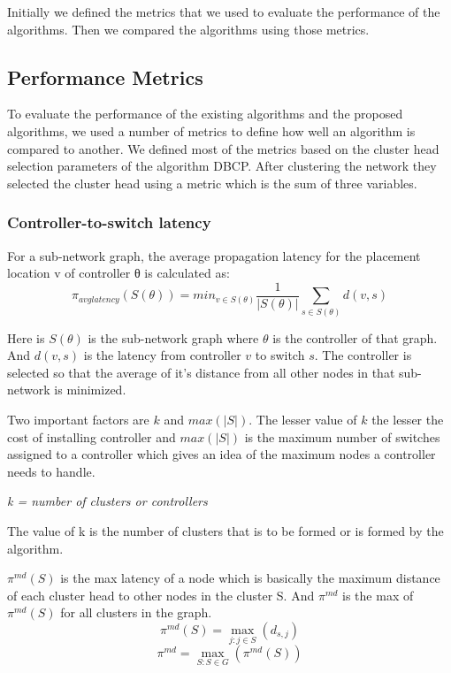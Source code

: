 \documentclass[8pt]{extarticle}
\begin{document}
	Initially we defined the metrics that we used to evaluate the performance of the algorithms. Then we compared the algorithms using those metrics.
	
	\subsection{Performance Metrics} \label{perfm}
	
	To evaluate the performance of the existing algorithms and the proposed algorithms, we used a number of metrics to define how well an algorithm is compared to another. We defined most of the metrics based on the cluster head selection parameters of the algorithm DBCP.
	After clustering the network they selected the cluster head using a metric which is the sum of three variables.
	
	\subsubsection{Controller-to-switch latency}
	For a sub-network graph, the average propagation latency for
	the placement location v of controller θ is calculated as:
	\begin{equation}
	\pi_{avglatency}(S(\theta)) = min_{v\in S(\theta)} \frac{1}{|S(\theta)|} \sum_{s\in S(\theta)}d(v,s)
	\end{equation}
	
	Here is $S(\theta)$ is the sub-network graph where $\theta$ is the controller of that graph. And $d(v,s)$ is the latency from controller $v$ to switch $s$. The controller is selected so that the average of it's distance from all other nodes in that sub-network is minimized.
	
	Two important factors are $k$ and $max(|S|)$. The lesser value of $k$ the lesser the cost of installing controller and $max(|S|)$ is the maximum number of switches assigned to a controller which gives an idea of the maximum nodes a controller needs to handle.
	
	\begin{center}
		\emph{k = number of clusters or controllers}
	\end{center}
	The value of k is the number of clusters that is to be formed or is formed by the algorithm.
	
	$\pi^{md}(S)$ is the max latency of a node which is basically the maximum distance of each cluster head to other nodes in the cluster S. And $\pi^{md}$ is the max of $\pi^{md}(S)$ for all clusters in the graph.
	\begin{equation}
	\pi^{md}(S)=\max_{j:j\in S}(d_{s,j})
	\end{equation}
	\begin{equation}
	\pi^{md}=\max_{S:S\in G}(\pi^{md}(S))
	\end{equation}
	
\end{document}
